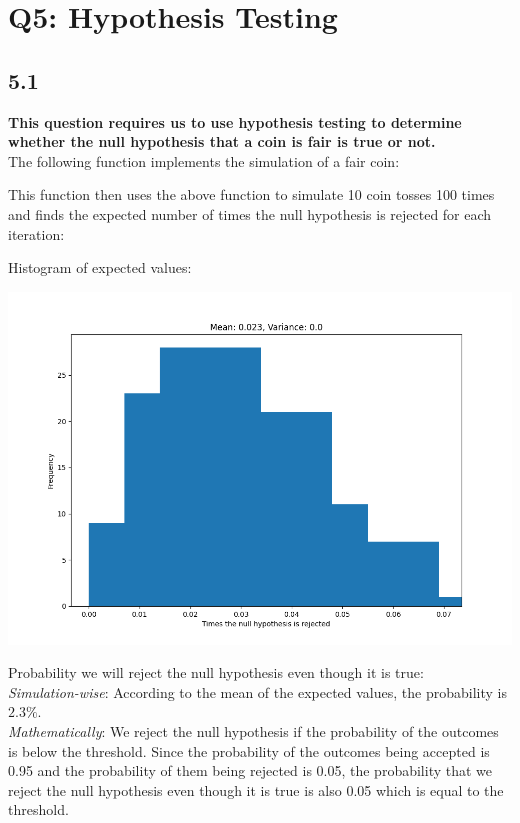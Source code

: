 \documentclass[answers]{exam}
\begin{document}
\pagebreak
\section*{Q5: Hypothesis Testing}
\subsection*{5.1}
\textbf{This question requires us to use hypothesis testing to determine whether the null hypothesis that a coin is fair is true or not. }\\
The following function implements the simulation of a fair coin:

This function then uses the above function to simulate 10 coin tosses 100 times and finds the expected number of times the null hypothesis is rejected for each iteration:

Histogram of expected values:
\begin{center}
  \includegraphics[scale = 0.5]{Q5_histograms/Q5.1.png}
\end{center}
Probability we will reject the null hypothesis even though it is true:\\
\emph{Simulation-wise}: According to the mean of the expected values, the probability is $2.3\%$.\\
\emph{Mathematically}: We reject the null hypothesis if the probability of the outcomes is below the threshold. Since the probability of the outcomes being accepted is 0.95 and the probability of them being rejected is 0.05, the probability that we reject the null hypothesis even though it is true is also 0.05 which is equal to the threshold.
\end{document}
